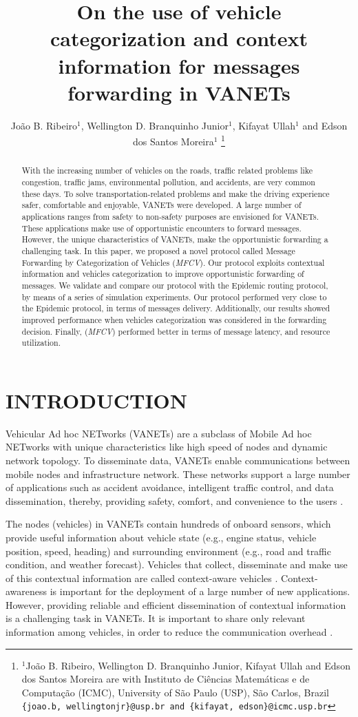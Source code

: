 \documentclass[letterpaper, 10 pt, conference]{ieeeconf}  %
\title{\LARGE \bf On the use of vehicle categorization and context information for messages forwarding in VANETs}
\author{João B. Ribeiro$^{1}$, Wellington D. Branquinho Junior$^{1}$, Kifayat Ullah$^{1}$ and Edson dos Santos Moreira$^{1}$
\thanks{$^{1}$João B. Ribeiro, Wellington D. Branquinho Junior, Kifayat Ullah and Edson dos Santos Moreira are with Instituto de Ciências Matemáticas e de Computação (ICMC), University of São Paulo (USP), São Carlos, Brazil
    \tt\small \{joao.b, wellingtonjr\}@usp.br and \{kifayat, edson\}@icmc.usp.br}
}
\begin{document}
\maketitle
\thispagestyle{empty}
\pagestyle{empty}

\begin{abstract}

With the increasing number of vehicles on the roads, traffic related problems like congestion, traffic jams, environmental pollution, and accidents, are very common these days. To solve transportation-related problems and make the driving experience safer, comfortable and enjoyable, VANETs were developed. A large number of applications ranges from safety to non-safety purposes are envisioned for VANETs. These applications make use of opportunistic encounters to forward messages. However, the unique characteristics of VANETs, make the opportunistic forwarding a challenging task. In this paper, we proposed a novel protocol called Message Forwarding by Categorization of Vehicles (\emph{MFCV}). Our protocol exploits contextual information and vehicles categorization to improve opportunistic forwarding of messages. We validate and compare our protocol with the Epidemic routing protocol, by means of a series of simulation experiments. Our protocol performed very close to the Epidemic protocol, in terms of messages delivery. Additionally, our results showed improved performance when vehicles categorization was considered in the forwarding decision. Finally, (\emph{MFCV}) performed better in terms of message latency, and resource utilization.

\end{abstract}

\IEEEpeerreviewmaketitle

\section{INTRODUCTION}

Vehicular Ad hoc NETworks (VANETs) are a subclass of Mobile Ad hoc NETworks with unique characteristics like high speed of nodes and dynamic network topology. To disseminate data, VANETs enable communications between mobile nodes and infrastructure network. These networks support a large number of applications such as accident avoidance, intelligent traffic control, and data dissemination, thereby, providing safety, comfort, and convenience to the users \cite{conprova2013}.

The nodes (vehicles) in VANETs contain hundreds of onboard sensors, which provide useful information about vehicle state (e.g., engine status, vehicle position, speed, heading) and surrounding environment (e.g., road and traffic condition, and weather forecast). Vehicles that collect, disseminate and make use of this contextual information are called context-aware vehicles \cite{grilli2009}. Context-awareness is important for the deployment of a large number of new applications. However, providing reliable and efficient dissemination of contextual information is a challenging task in VANETs. It is important to share only relevant information among vehicles, in order to reduce the communication overhead \cite{kumar2015}.
\end{document}
